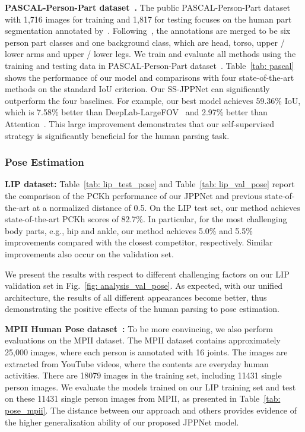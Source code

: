 \documentclass[10pt,journal,compsoc]{IEEEtran}
\begin{document}
\textbf{PASCAL-Person-Part dataset~\cite{chen2014detect}.}
The public PASCAL-Person-Part dataset with 1,716 images for training and 1,817 for testing focuses on the human part segmentation annotated by~\cite{chen2014detect}. Following~\cite{chen2015attention,xia2015zoom}, the annotations are merged to be six person part classes and one background class, which are head, torso, upper / lower arms and upper / lower legs. {We train and evaluate all methods using the training and testing data in PASCAL-Person-Part dataset~\cite{chen2014detect}.} Table~\ref{tab: pascal} shows the performance of our model and comparisons with four state-of-the-art methods on the standard IoU criterion. Our SS-JPPNet can significantly outperform the four baselines. For example, our best model achieves 59.36\% IoU, which is 7.58\% better than DeepLab-LargeFOV~\cite{chen2016deeplab} and 2.97\% better than Attention~\cite{chen2015attention}. 
This large improvement demonstrates that our self-supervised strategy is significantly beneficial for the human parsing task.



\subsubsection{Pose Estimation}
\textbf{LIP dataset:}
Table~\ref{tab: lip_test_pose} and Table~\ref{tab: lip_val_pose} report the comparison of the PCKh performance of our JPPNet and previous state-of-the-art at a normalized distance of 0.5. On the LIP test set, our method achieves state-of-the-art PCKh scores of 82.7\%. In particular, for the most challenging body parts, e.g., hip and ankle, our method achieves 5.0\% and 5.5\% improvements compared with the closest competitor, respectively. Similar improvements also occur on the validation set.

We present the results with respect to different challenging factors on our LIP validation set in Fig.~\ref{fig: analysis_val_pose}. As expected, with our unified architecture, the results of all different appearances become better, thus demonstrating the positive effects of the human parsing to pose estimation.

\textbf{MPII Human Pose dataset~\cite{andriluka14cvpr}:}
To be more convincing, we also perform evaluations on the MPII dataset. The MPII dataset contains approximately 25,000 images, where each person is annotated with 16 joints. The images are extracted from YouTube videos, where the contents are everyday human activities. There are 18079 images in the training set, including 11431 single person images. We evaluate the models trained on our LIP training set and test on these 11431 single person images from MPII, as presented in Table~\ref{tab: pose_mpii}. The distance between our approach and others provides evidence of the higher generalization ability of our proposed JPPNet model.
\end{document}
